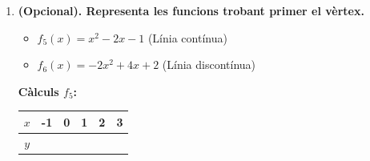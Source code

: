 \documentclass[12pt,a4paper]{article}
\begin{document}
\begin{enumerate}[label=\textbf{\arabic*.}]
\begin{enumerate}[label=\textbf{\alph*.}]
        \item \textbf{TVM de $f_4$ a l'interval $[0, 2]$:}
        \vspace{2cm} %
    \end{enumerate}

    \section*{Representació a partir del vèrtex}
    
    Per representar una paràbola és útil trobar primer el seu vèrtex $(x_v, y_v)$.
    \begin{itemize}
        \item Coordenada X: $x_{v} = \frac{-b}{2a}$
        \item Coordenada Y: Substituïm el valor trobat a la funció.
    \end{itemize}

    \newpage
    \noindent \textbf{Exemple:} $f_1(x) = x^2 - 2x + 1$ ($a=1, b=-2$)
    \begin{itemize}
        \item $x_v = \frac{-(-2)}{2\cdot 1} = \frac{2}{2} = 1$
        \item $y_v = f_1(1) = 1^2 - 2(1) + 1 = 0$
        \item \textbf{Vèrtex:} $(1, 0)$.
    \end{itemize}

    \item \textbf{(Opcional). Representa les funcions trobant primer el vèrtex.}
    \begin{itemize}
        \item $f_5(x) = x^2 - 2x - 1$ \quad (Línia contínua)
        \item $f_6(x) = -2x^2 + 4x + 2$ \quad (Línia discontínua)
    \end{itemize}
    
    \noindent
    \begin{minipage}{0.45\textwidth}
        \textbf{Càlculs $f_5$:} \\
        \vspace{3cm} %
        
        \begin{tabular}{|c|c|c|c|c|c|}
        \hline
        $x$ & -1 & 0 & 1 & 2 & 3 \\ \hline
        $y$ & & & & & \\ \hline
        \end{tabular}
        

\end{minipage}
\end{enumerate}
\end{document}
